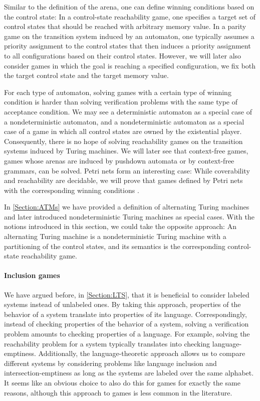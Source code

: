\documentclass[../../diss.tex]{subfiles}
\begin{document}
Similar to the definition of the arena, one can define winning conditions based on the control state:
In a control-state reachability game, one specifies a target set of control states that should be reached with arbitrary memory value.
In a parity game on the transition system induced by an automaton, one typically assumes a priority assignment to the control states that then induces a priority assignment to all configurations based on their control states.
However, we will later also consider games in which the goal is reaching a specified configuration, \ie we fix both the target control state and the target memory value.

For each type of automaton, solving games with a certain type of winning condition is harder than solving verification problems with the same type of acceptance condition.
We may see a deterministic automaton as a special case of a nondeterministic automaton, and a nondeterministic automaton as a special case of a game in which all control states are owned by the existential player.
Consequently, there is no hope of solving reachability games on the transition systems induced by Turing machines.
We will later see that context-free games, games whose arenas are induced by pushdown automata or by context-free grammars, can be solved.
Petri nets form an interesting case: While coverability and reachability are decidable, we will prove that games defined by Petri nets with the corresponding winning conditions .

\begin{remark*}
    In \cref{Section:ATMs} we have provided a definition of alternating Turing machines and later introduced nondeterministic Turing machines as special cases.
    With the notions introduced in this section, we could take the opposite approach: An alternating Turing machine is a nondeterministic Turing machine with a partitioning of the control states, and its semantics is the corresponding control-state reachability game.
\end{remark*}

\paragraph{Inclusion games}

We have argued before, \eg in \cref{Section:LTS}, that it is beneficial to consider labeled systems instead of unlabeled ones.
By taking this approach, properties of the behavior of a system translate into properties of its language.
Correspondingly, instead of checking properties of the behavior of a system, solving a verification problem amounts to checking properties of a language.
For example, solving the reachability problem for a system typically translates into checking language-emptiness.
Additionally, the language-theoretic approach allows us to compare different systems by considering problems like language inclusion and intersection-emptiness as long as the systems are labeled over the same alphabet.
It seems like an obvious choice to also do this for games for exactly the same reasons, although this approach to games is less common in the literature.
\end{document}
